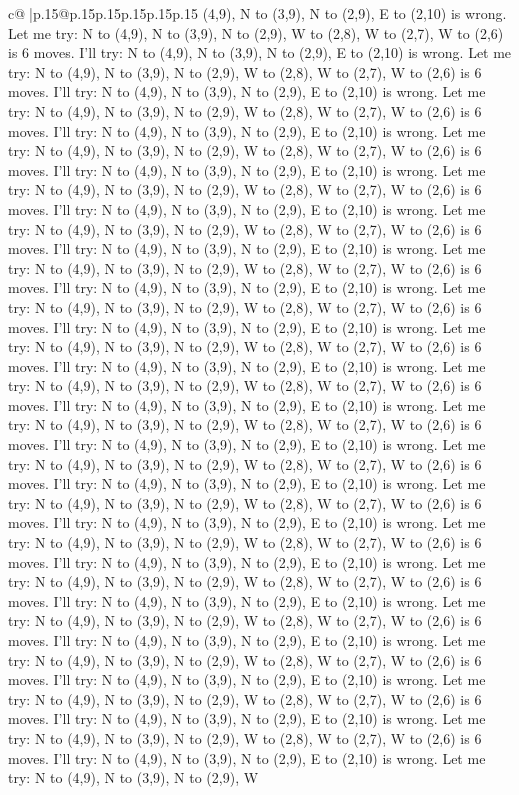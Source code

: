 \documentclass{article}
\begin{document}
{\begin{supertabular}{c@{$\;$}|p{.15\linewidth}@{}p{.15\linewidth}p{.15\linewidth}p{.15\linewidth}p{.15\linewidth}p{.15\linewidth}}
{{{(4,9), N to (3,9), N to (2,9), E to (2,10) is wrong. Let me try: N to (4,9), N to (3,9), N to (2,9), W to (2,8), W to (2,7), W to (2,6) is 6 moves. I'll try: N to (4,9), N to (3,9), N to (2,9), E to (2,10) is wrong. Let me try: N to (4,9), N to (3,9), N to (2,9), W to (2,8), W to (2,7), W to (2,6) is 6 moves. I'll try: N to (4,9), N to (3,9), N to (2,9), E to (2,10) is wrong. Let me try: N to (4,9), N to (3,9), N to (2,9), W to (2,8), W to (2,7), W to (2,6) is 6 moves. I'll try: N to (4,9), N to (3,9), N to (2,9), E to (2,10) is wrong. Let me try: N to (4,9), N to (3,9), N to (2,9), W to (2,8), W to (2,7), W to (2,6) is 6 moves. I'll try: N to (4,9), N to (3,9), N to (2,9), E to (2,10) is wrong. Let me try: N to (4,9), N to (3,9), N to (2,9), W to (2,8), W to (2,7), W to (2,6) is 6 moves. I'll try: N to (4,9), N to (3,9), N to (2,9), E to (2,10) is wrong. Let me try: N to (4,9), N to (3,9), N to (2,9), W to (2,8), W to (2,7), W to (2,6) is 6 moves. I'll try: N to (4,9), N to (3,9), N to (2,9), E to (2,10) is wrong. Let me try: N to (4,9), N to (3,9), N to (2,9), W to (2,8), W to (2,7), W to (2,6) is 6 moves. I'll try: N to (4,9), N to (3,9), N to (2,9), E to (2,10) is wrong. Let me try: N to (4,9), N to (3,9), N to (2,9), W to (2,8), W to (2,7), W to (2,6) is 6 moves. I'll try: N to (4,9), N to (3,9), N to (2,9), E to (2,10) is wrong. Let me try: N to (4,9), N to (3,9), N to (2,9), W to (2,8), W to (2,7), W to (2,6) is 6 moves. I'll try: N to (4,9), N to (3,9), N to (2,9), E to (2,10) is wrong. Let me try: N to (4,9), N to (3,9), N to (2,9), W to (2,8), W to (2,7), W to (2,6) is 6 moves. I'll try: N to (4,9), N to (3,9), N to (2,9), E to (2,10) is wrong. Let me try: N to (4,9), N to (3,9), N to (2,9), W to (2,8), W to (2,7), W to (2,6) is 6 moves. I'll try: N to (4,9), N to (3,9), N to (2,9), E to (2,10) is wrong. Let me try: N to (4,9), N to (3,9), N to (2,9), W to (2,8), W to (2,7), W to (2,6) is 6 moves. I'll try: N to (4,9), N to (3,9), N to (2,9), E to (2,10) is wrong. Let me try: N to (4,9), N to (3,9), N to (2,9), W to (2,8), W to (2,7), W to (2,6) is 6 moves. I'll try: N to (4,9), N to (3,9), N to (2,9), E to (2,10) is wrong. Let me try: N to (4,9), N to (3,9), N to (2,9), W to (2,8), W to (2,7), W to (2,6) is 6 moves. I'll try: N to (4,9), N to (3,9), N to (2,9), E to (2,10) is wrong. Let me try: N to (4,9), N to (3,9), N to (2,9), W to (2,8), W to (2,7), W to (2,6) is 6 moves. I'll try: N to (4,9), N to (3,9), N to (2,9), E to (2,10) is wrong. Let me try: N to (4,9), N to (3,9), N to (2,9), W to (2,8), W to (2,7), W to (2,6) is 6 moves. I'll try: N to (4,9), N to (3,9), N to (2,9), E to (2,10) is wrong. Let me try: N to (4,9), N to (3,9), N to (2,9), W to (2,8), W to (2,7), W to (2,6) is 6 moves. I'll try: N to (4,9), N to (3,9), N to (2,9), E to (2,10) is wrong. Let me try: N to (4,9), N to (3,9), N to (2,9), W to (2,8), W to (2,7), W to (2,6) is 6 moves. I'll try: N to (4,9), N to (3,9), N to (2,9), E to (2,10) is wrong. Let me try: N to (4,9), N to (3,9), N to (2,9), W to (2,8), W to (2,7), W to (2,6) is 6 moves. I'll try: N to (4,9), N to (3,9), N to (2,9), E to (2,10) is wrong. Let me try: N to (4,9), N to (3,9), N to (2,9), W }}}
\end{supertabular}}
\end{document}
